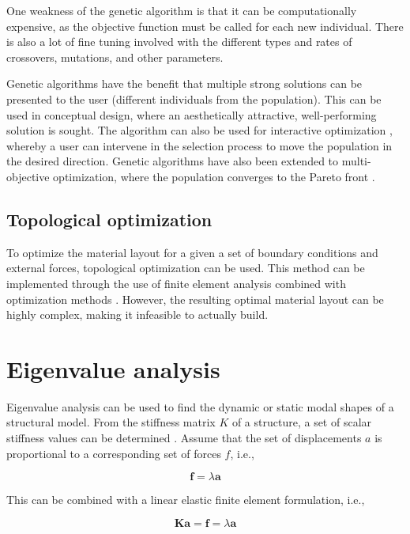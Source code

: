 One weakness of the genetic algorithm is that it can be computationally expensive, as the objective function must be called for each new individual. There is also a lot of fine tuning involved with the different types and rates of crossovers, mutations, and other parameters. 

Genetic algorithms have the benefit that multiple strong solutions can be presented to the user (different individuals from the population). This can be used in conceptual design, where an aesthetically attractive, well-performing solution is sought. The algorithm can also be used for interactive optimization \cite{Scott2002}, whereby a user can intervene in the selection process to move the population in the desired direction. Genetic algorithms have also been extended to multi-objective optimization, where the population converges to the Pareto front \cite{deb2002fast}.

\subsection{Topological optimization}
To optimize the material layout for a given a set of boundary conditions and external forces, topological optimization can be used. This method can be implemented through the use of finite element analysis combined with optimization methods \cite{bendsoe2009topology}. However, the resulting optimal material layout can be highly complex, making it infeasible to actually build.

\section{Eigenvalue analysis}
Eigenvalue analysis can be used to find the dynamic or static modal shapes of a structural model. From the stiffness matrix $K$ of a structure, a set of scalar stiffness values can be determined \cite{Olsson2003}. Assume that the set of displacements $a$ is proportional to a corresponding set of forces $f$, i.e.,

\begin{equation*}
\mathbf{f} = \lambda \mathbf{a}
\end{equation*}

This can be combined with a linear elastic finite element formulation, i.e.,

\begin{equation*}
\mathbf{Ka} =\mathbf{f} = \lambda \mathbf{a}
\end{equation*}

